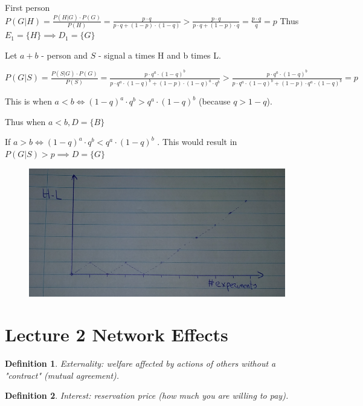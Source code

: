 \documentclass[12pt]{scrartcl}
\newtheorem{defi}{Definition}
\begin{document}
\noindent First person $P(G|H) = \frac{P(H|G)\cdot P(G)}{P(H)} = \frac{p\cdot q}{p\cdot q + (1-p)\cdot (1-q)} > \frac{p\cdot q}{p\cdot q + (1-p)\cdot q} = \frac{p\cdot q}{q} = p$\newline
Thus $E_{1} = \{H\}\implies D_{1} = \{G\}$\newline

\noindent Let $a+b$ - person and $S$ - signal a times H and b times L.

\noindent $P(G|S) = \frac{P(S|G)\cdot P(G)}{P(S)} = \frac{p\cdot q^{a}\cdot (1-q)^{b}}{p\cdot q^{a}\cdot (1-q)^{b} + (1-p)\cdot (1-q)^{a}\cdot q^{b}} > \frac{p\cdot q^{a}\cdot (1-q)^{b}}{p\cdot q^{a}\cdot (1-q)^{b} + (1-p)\cdot q^{a}\cdot (1-q)^{b}} = p$

\noindent This is when $a < b \iff (1-q)^{a}\cdot q^{b} > q^{a}\cdot (1-q)^{b}$ (because $q>1-q$). 

\noindent Thus when $a < b, D = \{B\}$

\noindent If $a > b \iff (1-q)^{a}\cdot q^{b} < q^{a}\cdot (1-q)^{b}$ . This would result in $P(G|S) > p \implies D = \{G\}$

\begin{figure}[h]
	\centering
	\includegraphics[width=\textwidth]{./images/graph_lecture_1.png}
\end{figure}

\newpage
\section{Lecture 2 Network Effects} 
\begin{defi}
	Externality: welfare affected by actions of others without a "contract" (mutual agreement).
\end{defi}

\begin{defi}
	Interest: reservation price (how much you are willing to pay).\end{defi}
\end{document}
